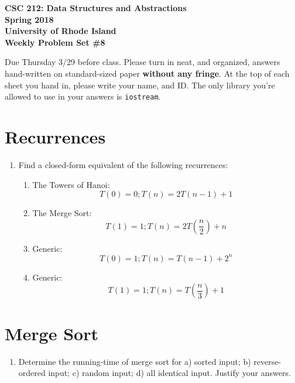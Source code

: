 \documentclass[11pt]{article}
\begin{document}
\thispagestyle{empty}

\begin{center}
    {\Large\bf CSC 212: Data Structures and Abstractions}\\
    \medskip
    {\Large\bf Spring 2018}\\
    \medskip
    {\Large\bf University of Rhode Island}\\
    \bigskip
    {\Large\bf Weekly Problem Set \#8}
\end{center}

Due Thursday 3/29 before class. Please turn in neat, and organized, answers hand-written on standard-sized paper \textbf{without any fringe}. At the top of each sheet you hand in, please write your name, and ID.
The only library you're allowed to use in your answers is \verb|iostream|.

\section{Recurrences}
\begin{enumerate}
    \item Find a closed-form equivalent of the following recurrences:
    \begin{enumerate} 
        \item The Towers of Hanoi:
        $$T(0) = 0; T(n) = 2T(n-1) + 1$$
    
        \item The Merge Sort:
        $$T(1) = 1; T(n) = 2T(\frac{n}{2}) + n$$
    
        \item Generic:
        $$T(0) = 1; T(n) = T(n - 1) + 2^n$$
    
        \item Generic:
        $$T(1) = 1; T(n) = T(\frac{n}{3}) + 1$$
        
    \end{enumerate}

\end{enumerate}
\section{Merge Sort} 
\begin{enumerate}

    \item Determine the running-time of merge sort for a) sorted input; b) reverse-ordered input; c) random input; d) all identical input. Justify your answers.

\end{enumerate}
\end{document}
